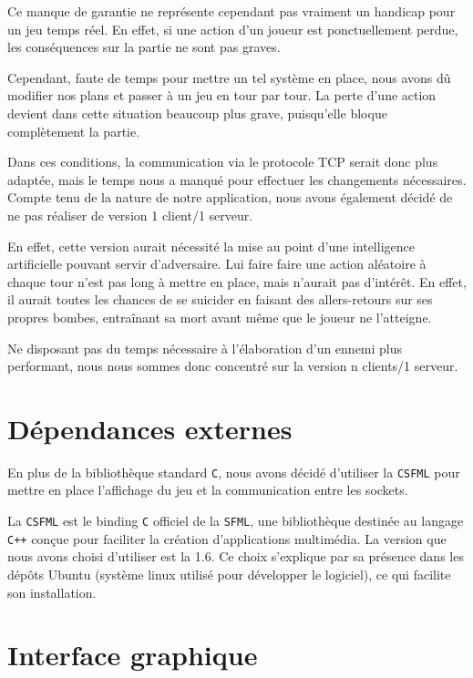 Ce manque de garantie ne représente cependant pas vraiment un handicap pour un jeu temps réel. En effet, si une action d'un joueur est ponctuellement perdue, les conséquences sur la partie ne sont pas graves.

Cependant, faute de temps pour mettre un tel système en place, nous avons dû modifier nos plans et passer à un jeu en tour par tour. La perte d'une action devient dans cette situation beaucoup plus grave, puisqu'elle bloque complètement la partie.

Dans ces conditions, la communication via le protocole TCP serait donc plus adaptée, mais le temps nous a manqué pour effectuer les changements nécessaires.\\

Compte tenu de la nature de notre application, nous avons également décidé de ne pas réaliser de version 1 client/1 serveur.

En effet, cette version aurait nécessité la mise au point d'une intelligence artificielle pouvant servir d'adversaire. Lui faire faire une action aléatoire à chaque tour n'est pas long à mettre en place, mais n'aurait pas d'intérêt. En effet, il aurait toutes les chances de se suicider en faisant des allers-retours sur ses propres bombes, entraînant sa mort avant même que le joueur ne l'atteigne.

Ne disposant pas du temps nécessaire à l'élaboration d'un ennemi plus performant, nous nous sommes donc concentré sur la version n clients/1 serveur.


\section*{Dépendances externes}

En plus de la bibliothèque standard \texttt{C}, nous avons décidé d'utiliser la \texttt{CSFML} pour mettre en place l'affichage du jeu et la communication entre les sockets.

La \texttt{CSFML} est le binding \texttt{C} officiel de la \texttt{SFML}, une bibliothèque destinée au langage \texttt{C++} conçue pour faciliter la création d'applications multimédia. La version que nous avons choisi d'utiliser est la 1.6. Ce choix s'explique par sa présence dans les dépôts Ubuntu (système linux utilisé pour développer le logiciel), ce qui facilite son installation.

\section*{Interface graphique}

